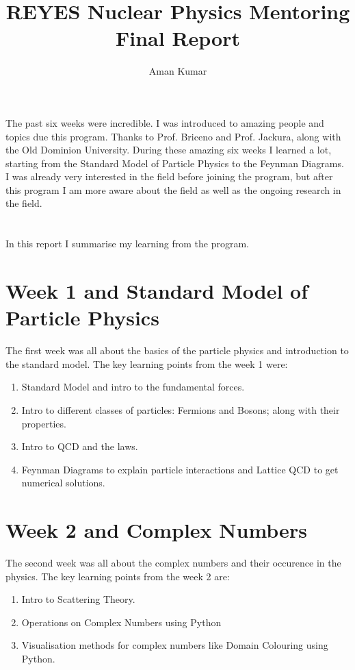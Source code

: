 \documentclass[a4paper]{article}
\title{REYES Nuclear Physics Mentoring Final Report}
\author{Aman Kumar}
\begin{document}
\maketitle
The past six weeks were incredible. I was introduced to amazing people and topics due this program. Thanks to Prof. Briceno and Prof. Jackura, along with the Old Dominion University.
During these amazing six weeks I learned a lot, starting from the Standard Model of Particle Physics to the Feynman Diagrams. I was already very interested in the field before joining the program, but 
after this program I am more aware about the field as well as the ongoing research in the field. 
\\ \\ \\
In this report I summarise my learning from the program. 


\section{Week 1 and Standard Model of Particle Physics}
The first week was all about the basics of the particle physics and introduction to the standard model. The key learning points from the week 1 were: 
\\
\begin{enumerate}
    \item Standard Model and intro to the fundamental forces.
    \item Intro to different classes of particles: Fermions and Bosons; along with their properties. 
    \item Intro to QCD and the laws. 
    \item Feynman Diagrams to explain particle interactions and Lattice QCD to get numerical solutions. 
\end{enumerate}

\section{Week 2 and Complex Numbers}
The second week was all about the complex numbers and their occurence in the physics. The key learning points from the week 2 are:
\\
\begin{enumerate}
    \item Intro to Scattering Theory. 
    \item Operations on Complex Numbers using Python
    \item Visualisation methods for complex numbers like Domain Colouring using Python.
\end{enumerate}
\end{document}
